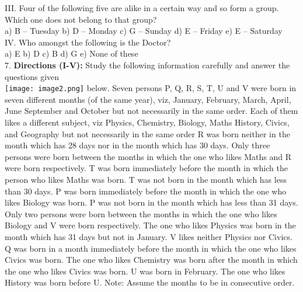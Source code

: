 \documentclass[
]{article}
\begin{document}
III. Four of the following five are alike in a certain way and so form a group. Which one does
not belong to that group?\\
a) B – Tuesday \hspace{2mm}b) D – Monday \hspace{2mm}c) G – Sunday
\hspace{2mm}d) E – Friday \hspace{2mm}e) E – Saturday\\

IV. Who amongst the following is the Doctor?\\
a) E \hspace{2mm}b) D \hspace{2mm}c) B \hspace{2mm}d) G \hspace{2mm}e) None of these\\

7. \textbf{Directions (I-V):} Study the following information carefully and answer the questions given\\
\texttt{[image: image2.png]}
below. Seven persons P, Q, R, S, T, U and V were born in seven different months (of the
same year), viz, January, February, March, April, June September and October but not
necessarily in the same order. Each of them likes a different subject, viz Physics, Chemistry,
Biology, Maths History, Civics, and Geography but not necessarily in the same order R was
born neither in the month which has 28 days nor in the month which has 30 days. Only
three persons were born between the months in which the one who likes Maths and R were
born respectively. T was born immediately before the month in which the person who likes
Maths was born. T was not born in the month which has less than 30 days. P was born
immediately before the month in which the one who likes Biology was born. P was not born
in the month which has less than 31 days. Only two persons were born between the months
in which the one who likes Biology and V were born respectively. The one who likes Physics
was born in the month which has 31 days but not in January. V likes neither Physics nor
Civics. Q was born in a month immediately before the month in which the one who likes
Civics was born. The one who likes Chemistry was born after the month in which the one
who likes Civics was born. U was born in February. The one who likes History was born
before U. Note: Assume the months to be in consecutive order.\\
\end{document}
